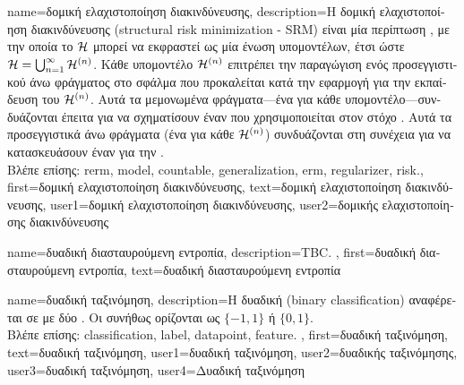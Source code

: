 {name={\foreignlanguage{greek}{δομική ελαχιστοποίηση διακινδύνευσης}}, 
	description={\foreignlanguage{greek}{Η δομική ελαχιστοποί\-ηση  
		διακινδύνευσης} 
		(structural risk minimization - SRM) \foreignlanguage{greek}{είναι μία περίπτωση} , \foreignlanguage{greek}{με την 
		οποία το}  $\mathcal{H}$ \foreignlanguage{greek}{μπορεί να εκφραστεί ως μία}  
		\foreignlanguage{greek}{ένωση υπομοντέλων, έτσι ώστε $\mathcal{H} = \bigcup_{n=1}^{\infty} \mathcal{H}^{(n)}$. 
		Κάθε υπομοντέλο $\mathcal{H}^{(n)}$ επιτρέπει την παραγώγιση ενός προσεγγιστικού άνω φράγματος στο σφάλμα}  
		 \foreignlanguage{greek}{που προκαλείται κατά την εφαρμογή}  
		\foreignlanguage{greek}{για την εκπαίδευση του $\mathcal{H}^{(n)}$. Αυτά τα μεμονωμένα φράγματα—ένα για κάθε 
		υπομοντέλο—συνδυάζονται έπειτα για να σχηματίσουν έναν}  
		\foreignlanguage{greek}{που χρησιμοποιείται στον στόχο} . \foreignlanguage{greek}{Αυτά τα προσεγγιστικά άνω 
		φράγματα (ένα για κάθε $\mathcal{H}^{(n)}$) συνδυάζονται στη συνέχεια για να κατασκευάσουν έναν}  
		\foreignlanguage{greek}{για την}  \cite[\foreignlanguage{greek}{Ενότητα}\ 7.2]{ShalevMLBook}.
		\\
		\foreignlanguage{greek}{Βλέπε επίσης:} \gls{rerm}, \gls{model}, \gls{countable}, \gls{generalization}, \gls{erm}, \gls{regularizer}, \gls{risk}.},
	first={\foreignlanguage{greek}{δομική ελαχιστοποίηση διακινδύνευσης}},
	text={\foreignlanguage{greek}{δομική ελαχιστοποίηση διακινδύνευσης}},
	user1={\foreignlanguage{greek}{δομική ελαχιστοποίηση διακινδύνευσης}}, %
  	user2={\foreignlanguage{greek}{δομικής ελαχιστοποίησης διακινδύνευσης}} %
}

{name={\foreignlanguage{greek}{δυαδική διασταυρούμενη εντροπία}},
	description={TBC. }, 
 	first={\foreignlanguage{greek}{δυαδική διασταυρούμενη εντροπία}},
 	text={\foreignlanguage{greek}{δυαδική διασταυρούμενη εντροπία}}
}

{name={\foreignlanguage{greek}{δυαδική ταξινόμηση}}, 
	description={\foreignlanguage{greek}{Η δυαδική}  
		(binary classification) \foreignlanguage{greek}{αναφέρεται σε}  
		\foreignlanguage{greek}{με δύο} . \foreignlanguage{greek}{Οι}  
		\foreignlanguage{greek}{συνήθως ορίζονται ως $\{-1, 1\}$ ή} $\{0, 1\}$. 
		\\ 
		\foreignlanguage{greek}{Βλέπε επίσης:} \gls{classification}, \gls{label}, \gls{datapoint}, \gls{feature}. },
	first={\foreignlanguage{greek}{δυαδική ταξινόμηση}},
	text={\foreignlanguage{greek}{δυαδική ταξινόμηση}},
	user1={\foreignlanguage{greek}{δυαδική ταξινόμηση}}, %
  	user2={\foreignlanguage{greek}{δυαδικής ταξινόμησης}}, %
	user3={\foreignlanguage{greek}{δυαδική ταξινόμηση}}, %
	user4={\foreignlanguage{greek}{Δυαδική ταξινόμηση}} %
}

